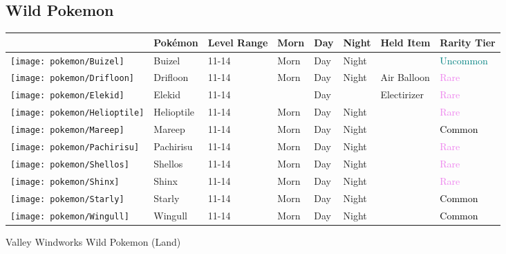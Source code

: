 \subsection{Wild Pokemon}%
\label{subsec:WildPokemon}%
\begin{longtable}{||l l l l l l l l||}%
\hline%
&Pokémon&Level Range&Morn&Day&Night&Held Item&Rarity Tier\\%
\hline%
\endhead%
\hline%
\texttt{[image: pokemon/Buizel]}&Buizel&11{-}14&Morn&Day&Night&&\textcolor{teal}{%
Uncommon%
}\\%
\hline%
\texttt{[image: pokemon/Drifloon]}&Drifloon&11{-}14&Morn&Day&Night&Air Balloon&\textcolor{violet}{%
Rare%
}\\%
\hline%
\texttt{[image: pokemon/Elekid]}&Elekid&11{-}14&&Day&&Electirizer&\textcolor{violet}{%
Rare%
}\\%
\hline%
\texttt{[image: pokemon/Helioptile]}&Helioptile&11{-}14&Morn&Day&Night&&\textcolor{violet}{%
Rare%
}\\%
\hline%
\texttt{[image: pokemon/Mareep]}&Mareep&11{-}14&Morn&Day&Night&&\textcolor{black}{%
Common%
}\\%
\hline%
\texttt{[image: pokemon/Pachirisu]}&Pachirisu&11{-}14&Morn&Day&Night&&\textcolor{violet}{%
Rare%
}\\%
\hline%
\texttt{[image: pokemon/Shellos]}&Shellos&11{-}14&Morn&Day&Night&&\textcolor{violet}{%
Rare%
}\\%
\hline%
\texttt{[image: pokemon/Shinx]}&Shinx&11{-}14&Morn&Day&Night&&\textcolor{violet}{%
Rare%
}\\%
\hline%
\texttt{[image: pokemon/Starly]}&Starly&11{-}14&Morn&Day&Night&&\textcolor{black}{%
Common%
}\\%
\hline%
\texttt{[image: pokemon/Wingull]}&Wingull&11{-}14&Morn&Day&Night&&\textcolor{black}{%
Common%
}\\%
\hline%
\end{longtable}%
\caption{Valley Windworks Wild Pokemon (Land)}%
